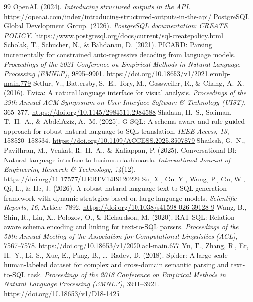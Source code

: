 \documentclass[11pt]{article}
\begin{document}
\begin{thebibliography}{99}
 OpenAI. (2024). \emph{Introducing structured outputs in the API}. \url{https://openai.com/index/introducing-structured-outputs-in-the-api/}
 PostgreSQL Global Development Group. (2026). \emph{PostgreSQL documentation: CREATE POLICY}. \url{https://www.postgresql.org/docs/current/sql-createpolicy.html}
 Scholak, T., Schucher, N., \& Bahdanau, D. (2021). PICARD: Parsing incrementally for constrained auto-regressive decoding from language models. \emph{Proceedings of the 2021 Conference on Empirical Methods in Natural Language Processing (EMNLP)}, 9895--9901. \url{https://doi.org/10.18653/v1/2021.emnlp-main.779}
 Setlur, V., Battersby, S.~E., Tory, M., Gossweiler, R., \& Chang, A.~X. (2016). Eviza: A natural language interface for visual analysis. \emph{Proceedings of the 29th Annual ACM Symposium on User Interface Software \& Technology (UIST)}, 365--377. \url{https://doi.org/10.1145/2984511.2984588}
 Shalaan, H.~S., Soliman, T.~H.~A., \& AbdelAziz, A.~M. (2025). G-SQL: A schema-aware and rule-guided approach for robust natural language to SQL translation. \emph{IEEE Access}, \emph{13}, 158520--158534. \url{https://doi.org/10.1109/ACCESS.2025.3607879}
 Shailesh, G.~N., Pavithran, M., Venkat, R.~H.~A., \& Kaliappan, P. (2025). Conversational BI: Natural language interface to business dashboards. \emph{International Journal of Engineering Research \& Technology}, \emph{14}(12). \url{https://doi.org/10.17577/IJERTV14IS120229}
 Su, X., Gu, Y., Wang, P., Gu, W., Qi, L., \& He, J. (2026). A robust natural language text-to-SQL generation framework with dynamic strategies based on large language models. \emph{Scientific Reports}, \emph{16}, Article~7892. \url{https://doi.org/10.1038/s41598-026-39128-9}
 Wang, B., Shin, R., Liu, X., Polozov, O., \& Richardson, M. (2020). RAT-SQL: Relation-aware schema encoding and linking for text-to-SQL parsers. \emph{Proceedings of the 58th Annual Meeting of the Association for Computational Linguistics (ACL)}, 7567--7578. \url{https://doi.org/10.18653/v1/2020.acl-main.677}
 Yu, T., Zhang, R., Er, H.~Y., Li, S., Xue, E., Pang, B., \ldots\ Radev, D. (2018). Spider: A large-scale human-labeled dataset for complex and cross-domain semantic parsing and text-to-SQL task. \emph{Proceedings of the 2018 Conference on Empirical Methods in Natural Language Processing (EMNLP)}, 3911--3921. \url{https://doi.org/10.18653/v1/D18-1425}

\end{thebibliography}
\end{document}
